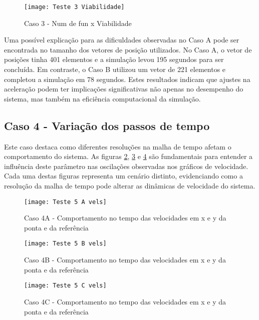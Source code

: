 \begin{figure}[H]
    \begin{center}
    \caption{Caso 3 - Num de fun x Viabilidade}
    \texttt{[image: Teste 3 Viabilidade]}
    \label{fig:t_3_viab}
    \end{center}
\end{figure}

Uma possível explicação para as dificuldades observadas no Caso A pode ser encontrada no tamanho dos vetores de posição utilizados. No Caso A, o vetor de posições tinha 401 elementos e a simulação levou 195 segundos para ser concluída. Em contraste, o Caso B utilizou um vetor de 221 elementos e completou a simulação em 78 segundos. Estes resultados indicam que ajustes na aceleração podem ter implicações significativas não apenas no desempenho do sistema, mas também na eficiência computacional da simulação.

\subsection{Caso 4 - Variação dos passos de tempo}
Este caso destaca como diferentes resoluções na malha de tempo afetam o comportamento do sistema. As figuras \ref{fig:t_5a_vels}, \ref{fig:t_5b_vels} e \ref{fig:t_5c_vels} são fundamentais para entender a influência deste parâmetro nas oscilações observadas nos gráficos de velocidade. Cada uma destas figuras representa um cenário distinto, evidenciando como a resolução da malha de tempo pode alterar as dinâmicas de velocidade do sistema.

\begin{figure}[H]
    \begin{center}
    \caption{Caso 4A - Comportamento no tempo das velocidades em x e y da ponta e da referência}
    \texttt{[image: Teste 5 A vels]}
    \label{fig:t_5a_vels}
    \end{center}
\end{figure}

\begin{figure}[H]
    \begin{center}
    \caption{Caso 4B - Comportamento no tempo das velocidades em x e y da ponta e da referência}
    \texttt{[image: Teste 5 B vels]}
    \label{fig:t_5b_vels}
    \end{center}
\end{figure}

\begin{figure}[H]
    \begin{center}
    \caption{Caso 4C - Comportamento no tempo das velocidades em x e y da ponta e da referência}
    \texttt{[image: Teste 5 C vels]}
    \label{fig:t_5c_vels}
    \end{center}
\end{figure}

